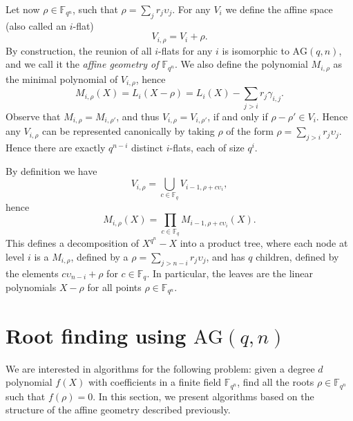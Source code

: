 \documentclass{sig-alternate}
\newcommand{\ff}[1]{\mathbb{F}_{#1}}
\newcommand{\dd}{d}
\newcommand{\qq}{q}
\newcommand{\nn}{n}
\newcommand{\qn}{{\qq^\nn}}
\newcommand{\basef}{\ff{\qq}}
\newcommand{\extf}{\ff{\qn}}
\newcommand{\AG}{\mathrm{AG}(\qq,\nn)}
\newcounter{algo}
\renewcommand{\paragraph}[1]{\smallskip\noindent{{\bf \rm #1.}}}
\begin{document}
\paragraph{The affine geometry of $\extf$} 
Let now $\rho\in\extf$, such that $\rho=\sum_jr_j\upsilon_j$.  For any
$V_i$ we define the affine space (also called an $i$-flat)
\begin{equation}
  V_{i,\rho} = V_i + \rho.
\end{equation}
By construction, the reunion of all $i$-flats for any $i$ is
isomorphic to $\AG$, and we call it the \emph{affine geometry of
  $\extf$}. We also define the polynomial $M_{i,\rho}$ as the minimal
polynomial of $V_{i,\rho}$, hence
\begin{equation}
\label{node_product}
  M_{i,\rho}(X) = L_i(X - \rho) = L_i(X) - \sum_{j>i}r_j\gamma_{i,j}.
\end{equation}
Observe that $M_{i,\rho}=M_{i,\rho'}$, and thus
$V_{i,\rho}=V_{i,\rho'}$, if and only if $\rho-\rho'\in V_i$. Hence
any $V_{i,\rho}$ can be represented canonically by taking $\rho$ of
the form $\rho=\sum_{j>i}r_j\upsilon_j$. Hence there are exactly
$\qq^{n-i}$ distinct $i$-flats, each of size $\qq^i$.

By definition we have
\begin{equation}
  V_{i,\rho} = \bigcup_{c\in\basef} V_{i-1,\rho + c\upsilon_i},
\end{equation}
hence
\begin{equation}
  M_{i,\rho}(X) = \prod_{c\in\basef} M_{i-1,\rho+c\upsilon_i}(X).
\end{equation}
This defines a decomposition of $X^{\qn}-X$ into a product tree, where
each node at level $i$ is a $M_{i,\rho}$, defined by a
$\rho=\sum_{j>n-i}r_j\upsilon_j$, and has $\qq$ children, defined by
the elements $c\upsilon_{n-i}+\rho$ for $c\in\basef$. In particular,
the leaves are the linear polynomials $X-\rho$ for all points
$\rho\in\extf$.



\section{Root finding using $\AG$}
\label{sec:arm-sra}

We are interested in algorithms for the following problem: given a
degree $\dd$ polynomial $f(X)$ with coefficients in a finite field
$\extf$, find all the roots $\rho\in\extf$ such that $f(\rho)=0$.  In
this section, we present algorithms based on the structure of the
affine geometry described previously.
\end{document}
